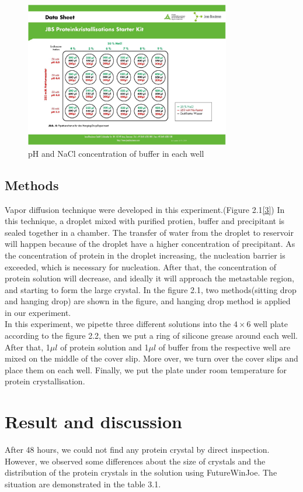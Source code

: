 \documentclass[a4paper,english,12pt,bibliography=totoc]{scrreprt}
\begin{document}
\begin{figure}[H]
        \centering
        \includegraphics[width=0.8\textwidth]{wells}
	    \caption{pH and NaCl concentration of buffer in each well}
\end{figure}

\section{Methods}
Vapor diffusion technique were developed in this experiment.(Figure 2.1\hyperref[sec:ref_3]{[3]}) In this technique, a droplet mixed with purified protien, buffer and precipitant is sealed together in a chamber. The transfer of water from the droplet to reservoir will happen because of the 
droplet have a higher concentration of precipitant. As the concentration of protein in the droplet increasing, the nucleation barrier is exceeded, which is necessary for nucleation. After that, the concentration of protein solution will decrease, and ideally it will approach the metastable region, and starting to form the large crystal. In the figure 2.1, two methods(sitting drop and hanging drop) are shown in the figure, and hanging drop method is applied in our experiment.\\


In this experiment, we pipette three different solutions into the \(4 \times 6\)  well plate according to the figure 2.2, then we put a ring of silicone grease around each well. After that, 1\(\mu l\) of protein solution and 1\(\mu l\) of buffer from the respective well are mixed on the middle of the cover slip. More over, we turn over the cover slips and place them on each well. Finally, we put the plate under room temperature for protein crystallisation.


\chapter{Result and discussion}
After 48 hours, we could not find any protein crystal by direct inspection. However, we observed some differences about the size of crystals and the distribution of the protein crystals in the solution using FutureWinJoe. The situation are demonstrated in the table 3.1.
\end{document}
